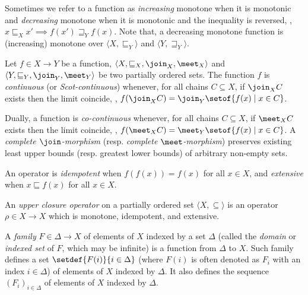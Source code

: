 Sometimes we refer to a function as \emph{increasing} monotone when it is monotonic and \emph{decreasing} monotone when it is monotonic and the inequality is reversed, \ie, $x \sqsubseteq_X x' \implies f(x') \sqsupseteq_Y f(x)$. Note that, a decreasing monotone function is (increasing) monotone over $\langle X, \sqsubseteq_Y \rangle$ and $\langle Y, \sqsupseteq_Y \rangle$.

\begin{definition}[Continuity]
  Let $f\in X \to Y$ be a function, $\langle X, \sqsubseteq_X, \join_X, \meet_X \rangle$ and $\langle Y, \sqsubseteq_Y, \join_Y, \meet_Y \rangle$ be two partially ordered sets.
  The function $f$ is \emph{continuous} (or \emph{Scot-continuous}) whenever, for all chains $C \subseteq X$, if $\join_X C$ exists then the limit coincide, \ie, $f(\join_X C) = \join_Y \setof{f(x) \mid x \in C}$.
\end{definition}

Dually, a function is \emph{co-continuous} whenever, for all chains $C \subseteq X$, if $\meet_X C$ exists then the limit coincide, \ie, $f(\meet_X C) = \meet_Y \setof{f(x) \mid x \in C}$. A \emph{complete $\join$-morphism} (resp. \emph{complete $\meet$-morphism}) preserves existing least upper bounds (resp. greatest lower bounds) of arbitrary non-empty sets.


An operator is \emph{idempotent} when $f(f(x)) = f(x)$ for all $x \in X$, and \emph{extensive} when $x \sqsubseteq f(x)$ for all $x \in X$.

\begin{definition}
  An \emph{upper closure operator} on a partially ordered set $\langle X, \subseteq \rangle$ is an operator $\rho\in X \to X$ which is monotone, idempotent, and extensive.
\end{definition}

A \emph{family} $F \in \Delta \to X$ of elements of $X$ indexed by a set $\Delta$ (called the \emph{domain} or \emph{indexed set} of $F$, which may be infinite) is a function from $\Delta$ to $X$. Such family defines a set $\setdef{F(i)}{i \in \Delta}$ (where $F(i)$ is often denoted as $F_i$ with an index $i\in\Delta$) of elements of $X$ indexed by $\Delta$.
It also defines the sequence $(F_i)_{i\in\Delta}$ of elements of $X$ indexed by $\Delta$.

